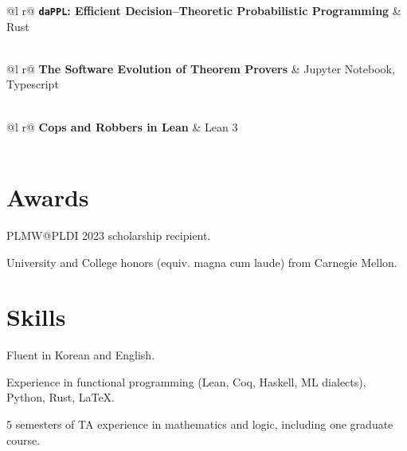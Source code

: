 \documentclass[12pt]{article}
\begin{document}
\begin{tabularx}{\linewidth}{ @{}l r@{} }
    \textbf{\texttt{daPPL}: Efficient Decision--Theoretic Probabilistic Programming} & \hfill Rust\\[3pt]
      \\
\end{tabularx}

\begin{tabularx}{\linewidth}{ @{}l r@{} }
    \textbf{The Software Evolution of Theorem Provers} & \hfill Jupyter Notebook, Typescript\\[3pt]
      \\
\end{tabularx}

\begin{tabularx}{\linewidth}{ @{}l r@{} }
\textbf{Cops and Robbers in Lean} & \hfill Lean 3\\[3pt]
  \\
\end{tabularx}

\section{Awards}

PLMW@PLDI 2023 scholarship recipient.

University and College honors (equiv. magna cum laude) from Carnegie Mellon.

\section{Skills}

Fluent in Korean and English.

Experience in functional programming (Lean, Coq, Haskell, ML dialects), Python, Rust, LaTeX.

5 semesters of TA experience in mathematics and logic, including one graduate course.
\end{document}
